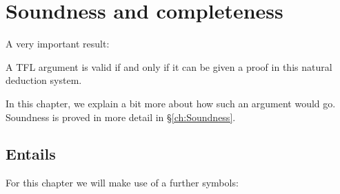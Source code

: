 \chapter{Soundness and completeness}
\label{sec:soundness_and_completeness}\nonexaminable

A very important result:
\begin{highlighted}
A TFL argument is valid if and only if it can be given a proof in this natural deduction system.
\end{highlighted}
In this chapter, we explain a bit more about how such an argument would go. Soundness is proved in more detail in \S\ref{ch:Soundness}.



\section{Entails}
For this chapter we will make use of a further symbols:
%


